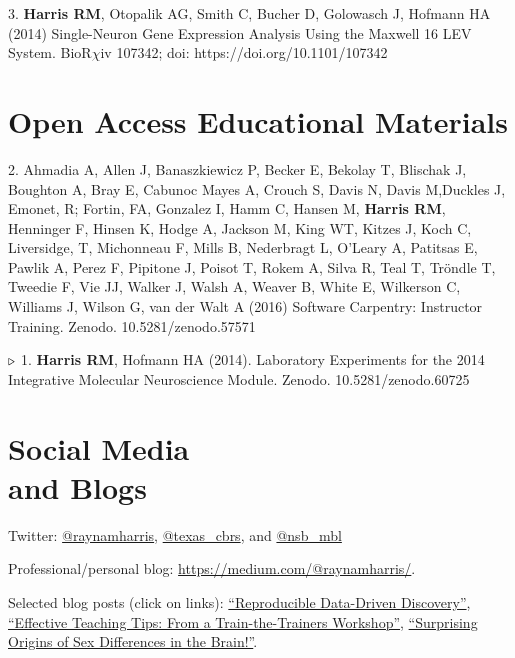 \documentclass[margin,line]{resume}
\begin{document}
\begin{resume}
3. {\bf Harris RM}, Otopalik AG, Smith C, Bucher D, Golowasch J, Hofmann HA (2014) Single-Neuron Gene Expression Analysis Using the Maxwell 16 LEV System. BioR$\chi$iv 107342; doi: https://doi.org/10.1101/107342

\section{\mysidestyle Open Access Educational Materials}

2. Ahmadia A, Allen J, Banaszkiewicz P, Becker E, Bekolay T, Blischak J, Boughton A, Bray E, Cabunoc Mayes A, Crouch S, Davis N, Davis M,Duckles J, Emonet, R; Fortin, FA, Gonzalez I, Hamm C, Hansen M, {\bf Harris RM}, Henninger F, Hinsen K, Hodge A, Jackson M, King WT, Kitzes J, Koch C, Liversidge, T, Michonneau F, Mills B, Nederbragt L, O'Leary A, Patitsas E, Pawlik A, Perez F, Pipitone J, Poisot T, Rokem A, Silva R, Teal T, Tröndle T, Tweedie F, Vie JJ, Walker J, Walsh A, Weaver B, White E, Wilkerson C, Williams J, Wilson G, van der Walt A (2016) Software Carpentry: Instructor Training. Zenodo. 10.5281/zenodo.57571 

{\color{red} ${\bf \triangleright}$}
1. 	{\bf Harris RM}, Hofmann HA (2014). Laboratory Experiments for the 2014 Integrative Molecular Neuroscience Module. Zenodo. 10.5281/zenodo.60725 


\section{\mysidestyle Social Media\\and Blogs}

Twitter: \href{http://twitter.com/raynamharris}{@raynamharris}, \href{http://twitter.com/texas\_cbrs}{@texas\_cbrs}, and \href{http://twitter.com/nsb\_mbl}{@nsb\_mbl} 

Professional/personal blog: \url{https://medium.com/@raynamharris/}.  

Selected blog posts (click on links): \href{https://medium.com/@raynamharris/reproducible-data-driven-discovery-decbf1de2f46#.c63q0cget}{``Reproducible Data-Driven Discovery''}, \href{http://blogs.plos.org/neuro/2015/02/12/effective-teaching-tips-from-a-train-the-trainers-workshop/}{``Effective Teaching Tips: From a Train-the-Trainers Workshop''}, \href{http://blogs.plos.org/neuro/2014/12/18/plos-sfn14-highlights-surprising-origins-of-sex-differences-in-the-brain/}{``Surprising Origins of Sex Differences in the Brain!''}.


\end{resume}
\end{document}
